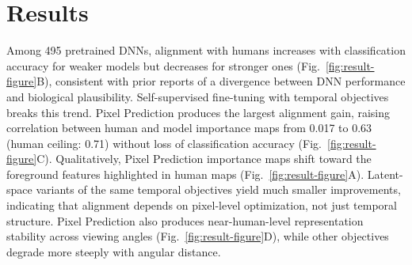 \documentclass[submission]{ccn}  %
\begin{document}
\section{Results}
Among 495 pretrained DNNs, alignment with humans increases with classification accuracy for weaker models but decreases for stronger ones (Fig.~\ref{fig:result-figure}B), consistent with prior reports of a divergence between DNN performance and biological plausibility. Self-supervised fine-tuning with temporal objectives breaks this trend. Pixel Prediction produces the largest alignment gain, raising correlation between human and model importance maps from 0.017 to 0.63 (human ceiling: 0.71) without loss of classification accuracy (Fig.~\ref{fig:result-figure}C). Qualitatively, Pixel Prediction importance maps shift toward the foreground features highlighted in human maps (Fig.~\ref{fig:result-figure}A). Latent-space variants of the same temporal objectives yield much smaller improvements, indicating that alignment depends on pixel-level optimization, not just temporal structure. Pixel Prediction also produces near-human-level representation stability across viewing angles (Fig.~\ref{fig:result-figure}D), while other objectives degrade more steeply with angular distance.





\newpage

\printbibliography
\end{document}
